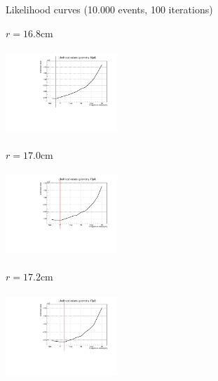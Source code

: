 \documentclass[8 pt]{beamer}
\begin{document}
\begin{frame}{Likelihood curves (10.000 events, 100 iterations)}
\justifying
\begin{minipage}[c]{.32\textwidth}
\begin{exampleblock}{} \begin{center}$r = 16.8$cm\end{center} \end{exampleblock}
\includegraphics[width=4.2cm, height=3.2cm]{figs/likelihood100LowStat/likelihood16p8.pdf} 
\end{minipage}
\begin{minipage}[c]{.32\textwidth}
\begin{exampleblock}{} \begin{center}$r = 17.0$cm\end{center} \end{exampleblock}
\includegraphics[width=4.2cm, height=3.2cm]{figs/likelihood100LowStat/likelihood17p0.pdf} 
\end{minipage}
\begin{minipage}[c]{.32\textwidth}
\begin{exampleblock}{} \begin{center}$r = 17.2$cm\end{center} \end{exampleblock}
\includegraphics[width=4.2cm, height=3.2cm]{figs/likelihood100LowStat/likelihood17p2.pdf} 
\end{minipage}


\end{frame}
\end{document}
